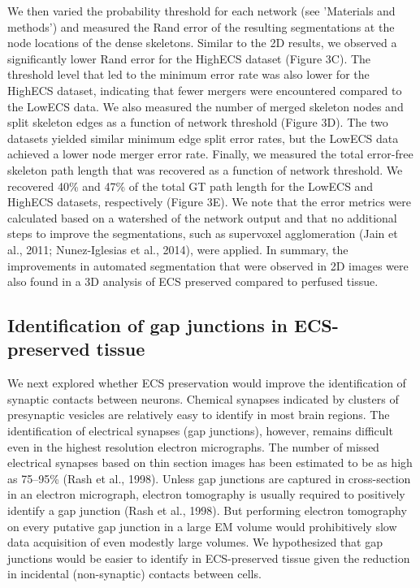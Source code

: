 \documentclass{article}
\begin{document}
We then varied the probability threshold for each network (see ’Materials and methods’) and measured the Rand error of the resulting segmentations at the node locations of the dense skeletons. Similar to the 2D results, we observed a significantly lower Rand error for the HighECS dataset (Figure 3C). The threshold level that led to the minimum error rate was also lower for the HighECS dataset, indicating that fewer mergers were encountered compared to the LowECS data. We also measured the number of merged skeleton nodes and split skeleton edges as a function of network threshold (Figure 3D). The two datasets yielded similar minimum edge split error rates, but the LowECS data achieved a lower node merger error rate. Finally, we measured the total error-free skeleton path length that was recovered as a function of network threshold. We recovered 40\% and 47\% of the total GT path length for the LowECS and HighECS datasets, respectively (Figure 3E). We note that the error metrics were calculated based on a watershed of the network output and that no additional steps to improve the segmentations, such as supervoxel agglomeration (Jain et al., 2011; Nunez-Iglesias et al., 2014), were applied. In summary, the improvements in automated segmentation that were observed in 2D images were also found in a 3D analysis of ECS preserved compared to perfused tissue.

\subsection*{Identification of gap junctions in ECS-preserved tissue}

We next explored whether ECS preservation would improve the identification of synaptic contacts between neurons. Chemical synapses indicated by clusters of presynaptic vesicles are relatively easy to identify in most brain regions. The identification of electrical synapses (gap junctions), however, remains difficult even in the highest resolution electron micrographs. The number of missed electrical synapses based on thin section images has been estimated to be as high as 75–95\% (Rash et al., 1998). Unless gap junctions are captured in cross-section in an electron micrograph, electron tomography is usually required to positively identify a gap junction (Rash et al., 1998). But performing electron tomography on every putative gap junction in a large EM volume would prohibitively slow data acquisition of even modestly large volumes. We hypothesized that gap junctions would be easier to identify in ECS-preserved tissue given the reduction in incidental (non-synaptic) contacts between cells.
\end{document}
